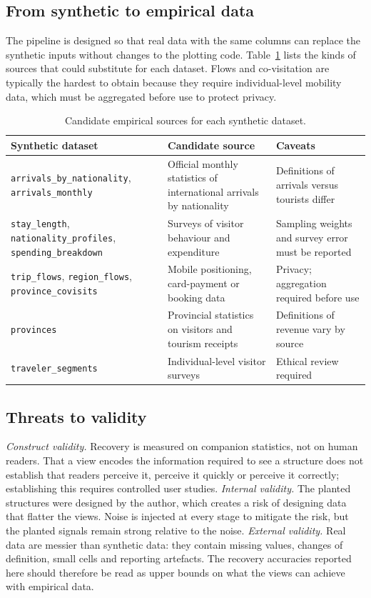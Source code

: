 \documentclass{article}
\begin{document}
\subsection{From synthetic to empirical data}
The pipeline is designed so that real data with the same columns can replace the synthetic inputs without
changes to the plotting code. Table~\ref{tab:realdata} lists the kinds of sources that could substitute for
each dataset. Flows and co-visitation are typically the hardest to obtain because they require individual-level
mobility data, which must be aggregated before use to protect privacy.

\begin{table}[!htbp]
\centering
\caption{Candidate empirical sources for each synthetic dataset.}
\label{tab:realdata}
\small
\begin{tabularx}{\linewidth}{@{}>{\raggedright\arraybackslash}p{4.5cm}>{\raggedright\arraybackslash}X>{\raggedright\arraybackslash}p{4.4cm}@{}}
\toprule
Synthetic dataset & Candidate source & Caveats \\
\midrule
\texttt{arrivals\_by\_nationality}, \texttt{arrivals\_monthly} & Official monthly statistics of international
arrivals by nationality & Definitions of arrivals versus tourists differ \\
\texttt{stay\_length}, \texttt{nationality\_profiles}, \texttt{spending\_breakdown} & Surveys of visitor behaviour
and expenditure & Sampling weights and survey error must be reported \\
\texttt{trip\_flows}, \texttt{region\_flows}, \texttt{province\_covisits} & Mobile positioning, card-payment or
booking data & Privacy; aggregation required before use \\
\texttt{provinces} & Provincial statistics on visitors and tourism receipts & Definitions of revenue vary by
source \\
\texttt{traveler\_segments} & Individual-level visitor surveys & Ethical review required \\
\bottomrule
\end{tabularx}
\end{table}

\subsection{Threats to validity}\label{sec:validity}
\emph{Construct validity.} Recovery is measured on companion statistics, not on human readers. That a view
encodes the information required to see a structure does not establish that readers perceive it, perceive it
quickly or perceive it correctly; establishing this requires controlled user studies.
\emph{Internal validity.} The planted structures were designed by the author, which creates a risk of
designing data that flatter the views. Noise is injected at every stage to mitigate the risk, but the planted
signals remain strong relative to the noise.
\emph{External validity.} Real data are messier than synthetic data: they contain missing values, changes of
definition, small cells and reporting artefacts. The recovery accuracies reported here should therefore be
read as upper bounds on what the views can achieve with empirical data.
\end{document}
